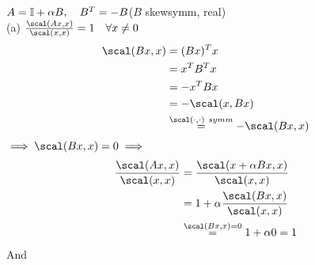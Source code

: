 
\begin{SolutionSheet}[\ref{sheet10}]
\begin{onehalfspace}

  \begin{Solution}$A = \mathbb{I} + \alpha B, \quad B^T = -B $($B$ skewsymm, real)\\
    (a) \Claim $\frac{\scal(Ax,x)}{\scal(x,x)} = 1 \quad \forall x \neq 0$\\
    \Proof \begin{align*}
      \scal(Bx,x) &= (Bx)^T x \\
      &= x^T B^T x \\
      &= -x^T Bx \\
      &= - \scal(x,Bx) \\
      &\stackrel{\scal(\cdot, \cdot) \ symm}{=} -\scal(Bx,x)
    \end{align*}
    $\implies \scal(Bx,x) = 0 \\
    \implies$ \begin{align*}  
      \frac{\scal(Ax,x)}{\scal(x,x)} &= \frac{\scal(x + \alpha Bx,x)}{\scal(x,x)} \\
      &= 1 + \alpha \frac{\scal(Bx,x)}{\scal(x,x)} \\
      &\stackrel{\scal(Bx,x) = 0}{=} 1+\alpha 0 = 1
  \end{align*}
  And 
  \end{Solution}

  \begin{Solution}
  \end{Solution}

  \begin{Solution}
  \end{Solution}

  \begin{Solution}[Programming]
  \end{Solution}

\end{onehalfspace}
\end{SolutionSheet}


